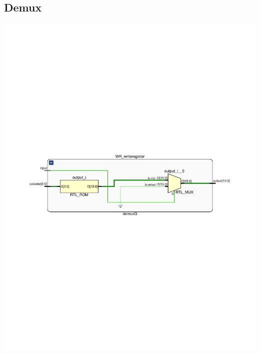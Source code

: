 \documentclass[8pt,executivepaper]{article}
\begin{document}
\subsection{Demux}
\begin{center}
  \includegraphics[scale=0.5]{sources/schematicDemuxRTL.pdf}
\end{center}
\end{document}
